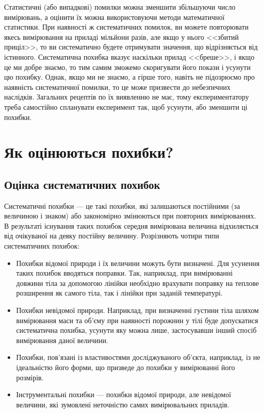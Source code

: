 \documentclass{LabBook}
\begin{document}
Статистичні (або випадкові) помилки можна зменшити збільшуючи число вимірювань, а оцінити їх можна використовуючи методи математичної статистики. При наявності ж систематичних помилок, ви можете повторювати якесь вимірювання на приладі мільйони разів, але якщо у нього <<збитий приціл>>, то ви систематично будете отримувати значення, що відрізняється від істинного. Систематична похибка вказує наскільки прилад <<бреше>>, і якщо це ми добре знаємо, то тим самим зможемо скоригувати його покази і усунути цю похибку. Однак, якщо ми не знаємо, а гірше того, навіть не підозрюємо про наявність систематичної помилки, то це може призвести до небезпечних наслідків. Загальних рецептів по їх виявленню не має, тому експериментатору треба самостійно спланувати експеримент так, щоб усунути, або зменшити ці похибки.


\chapter{Як оцінюються похибки?}






\section{Оцінка систематичних похибок}




  Систематичні похибки --- це такі похибки, які залишаються постійними (за величиною і знаком) або закономірно змінюються при повторних вимірюваннях. В результаті існування таких похибок середня вимірювана величина відхиляється від очікуваної на деяку постійну величину.
  Розрізняють чотири типи систематичних похибок:
  \begin{itemize}
    \item Похибки відомої природи і їх величини можуть бути визначені. Для усунення таких похибок вводяться поправки. Так, наприклад, при вимірюванні довжини тіла за допомогою лінійки необхідно врахувати поправку на теплове розширення як самого тіла, так і лінійки при заданій температурі.
    \item Похибки невідомої природи. Наприклад, при визначенні густини тіла шляхом вимірювання маси та об’єму при наявності порожнин у тілі буде допускатися систематична похибка, усунути яку можна лише, застосувавши інший спосіб вимірювання даної величини.
    \item Похибки, пов’язані із властивостями досліджуваного об’єкта, наприклад, із не ідеальністю його форми, що призведе до похибки у вимірюванні його розмірів.
    \item Інструментальні похибки --- похибки відомої природи, але невідомої величини, які зумовлені неточністю самих вимірювальних приладів.
  \end{itemize}
\end{document}
